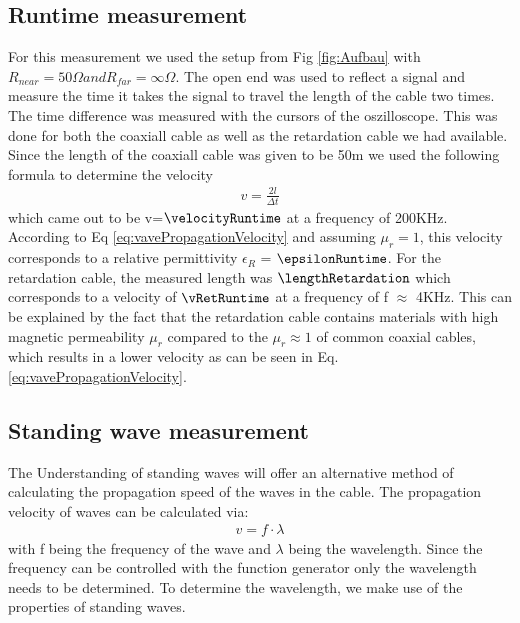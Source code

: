 \documentclass[a4paper,10pt,twocolumn]{article}
\begin{document}
    \subsection{Runtime measurement}
    \label{subsec:runtimeMeasurement}
    For this measurement we used the setup from Fig \ref{fig:Aufbau} with $R_{near}=50\Omega and R_{far}=\infty \Omega $.
    The open end was used to reflect a signal and measure the time it takes the signal to travel the length of the cable two times.
    The time difference was measured with the cursors of the oszilloscope.
    This was done for both the coaxiall cable as well as the retardation cable we had available.
    Since the length of the  coaxiall cable was given to be 50m we used the following formula to determine the velocity
    \begin{align}
        \label{eq:runtimeVelocity}
        v=\frac{2l}{\Delta t}
        \end{align}
    which came out to be v=$\velocityRuntime$ at a frequency of 200KHz.
    According to Eq \ref{eq:vavePropagationVelocity} and assuming $\mu_r = 1$, this velocity corresponds to a relative permittivity $\epsilon_R$ = $\epsilonRuntime$.
    \endline
    For the retardation cable, the measured length was $\lengthRetardation$ which corresponds to a velocity of $\vRetRuntime$ at a frequency of f $\approx$ 4KHz.
    This can be explained by the fact that the retardation cable contains materials with high magnetic permeability $\mu_r$ compared to the $\mu_r \approx 1 $ of common coaxial cables, which results in a lower velocity as can be seen in Eq. \ref{eq:vavePropagationVelocity}.
    \subsection{Standing wave measurement}
    \label{subsec:standingWaveMeasurement}
    The Understanding of standing waves will offer an alternative method of  calculating the propagation speed of the waves in the cable.
    The propagation velocity of waves can be calculated via:
    \begin{align}
        \label{eq:velocityStanding}
        v = f\cdot\lambda
        \end{align}
    with f being the frequency of the wave and $\lambda$ being the wavelength.
    Since the frequency can be controlled with the function generator only the wavelength needs to be determined.
    To determine the wavelength, we make use of the properties of standing waves. 
\end{document}
